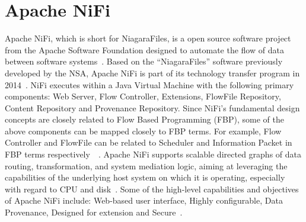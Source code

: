 \section{Apache NiFi}
Apache NiFi, which is short for NiagaraFiles, is a open source software project from the Apache 
Software Foundation designed to automate the flow of data between software 
systems~\cite{hid-sp18-405-wiki-nifi}. Based on the ``NiagaraFiles'' software previously developed by 
the NSA,  Apache NiFi is part of its technology transfer program in 2014~\cite{hid-sp18-405-wiki-nifi}. 
NiFi executes within a Java Virtual Machine with the following primary components: Web Server, Flow 
Controller, Extensions, FlowFile Repository, Content Repository and Provenance Repository. Since 
NiFi's fundamental design concepts are closely related to Flow Based Programming (FBP), some of the 
above components can be mapped closely to FBP terms. For example, Flow Controller and FlowFile can 
be related to Scheduler and Information Packet in FBP terms 
respectively~\cite{hid-sp18-405-wwwoverview-nifi}~\cite{hid-sp18-405-wikifbp-nifi}. 
Apache NiFi supports scalable directed graphs of data routing, transformation, and system mediation 
logic, aiming at leveraging the capabilities of the underlying host system on which it is operating, 
especially with regard to CPU and disk~\cite{hid-sp18-405-wwwoverview-nifi}. Some of the high-level 
capabilities and objectives of Apache NiFi include: Web-based user interface, Highly configurable, Data 
Provenance, Designed for extension and Secure~\cite{hid-sp18-405-www-nifi}.